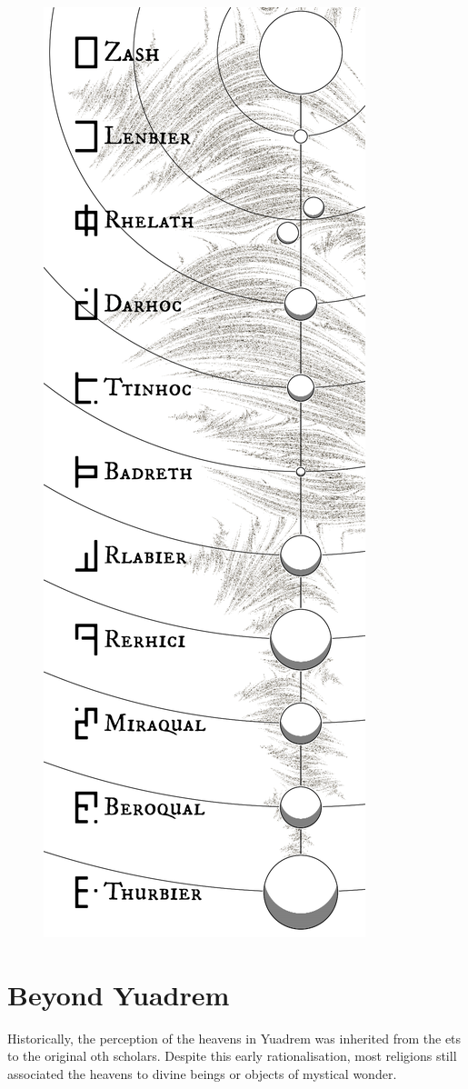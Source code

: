 \begin{figure}[H]
    \centering \includegraphics{01yuadrem/img/40solar_system.png}
\end{figure}
\section{Beyond Yuadrem}
Historically, the perception of the heavens in Yuadrem was inherited from the ets to the original oth scholars.
Despite this early rationalisation, most religions still associated the heavens to divine beings or objects of mystical wonder.




